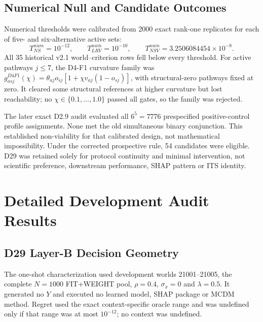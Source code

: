 \documentclass[runningheads]{llncs}
\begin{document}
\subsection{Numerical Null and Candidate Outcomes}

Numerical thresholds were calibrated from 2000 exact rank-one replicates for each of five- and
six-alternative active sets:
\begin{equation}
T^{num}_{NS}=10^{-12},\qquad
T^{num}_{LRV}=10^{-10},\qquad
T^{num}_{NSV}=3.2506084454\times10^{-8}.
\label{supp:eq:nullthresholds}
\end{equation}
All 35 historical v2.1 world--criterion rows fell below every threshold. For active pathways
\(j\leq7\), the D4-F1 curvature family was
\(g_{asj}^{D4F1}(\chi)=\theta_{aj}o_{sj}[1+\chi v_{aj}(1-o_{sj})]\), with structural-zero
pathways fixed at zero. It cleared some structural references at higher curvature but lost reachability; no
$\chi\in\{0.1,\ldots,1.0\}$ passed all gates, so the family was rejected.

The later exact D2.9 audit evaluated all $6^5=7776$ prespecified positive-control profile
assignments. None met the old simultaneous binary conjunction. This established non-viability
for that calibrated design, not mathematical impossibility. Under the corrected prospective
rule, 54 candidates were eligible. D29 was retained solely for protocol continuity and minimal
intervention, not scientific preference, downstream performance, SHAP pattern or ITS identity.

\section{Detailed Development Audit Results}

\subsection{D29 Layer-B Decision Geometry}

The one-shot characterization used development worlds 21001--21005, the complete $N=1000$
FIT+WEIGHT pool, $\rho=0.4$, $\sigma_x=0$ and $\lambda=0.5$. It generated no $Y$ and executed
no learned model, SHAP package or MCDM method. Regret used the exact context-specific oracle
range and was undefined only if that range was at most $10^{-12}$; no context was undefined.
\end{document}
